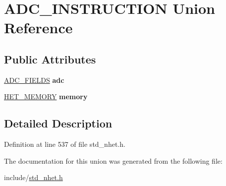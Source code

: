 \hypertarget{unionADC__INSTRUCTION}{}\section{A\+D\+C\+\_\+\+I\+N\+S\+T\+R\+U\+C\+T\+I\+ON Union Reference}
\label{unionADC__INSTRUCTION}
\subsection*{Public Attributes}
\begin{DoxyCompactItemize}
\item 
\mbox{\label{unionADC__INSTRUCTION_aae86e6a07f9b68ebf296733c9899a38d}} 
\mbox{\hyperlink{structADC__format}{A\+D\+C\+\_\+\+F\+I\+E\+L\+DS}} {\bfseries adc}
\item 
\mbox{\label{unionADC__INSTRUCTION_a8535b76695407a89e6a8a1fcf88804de}} 
\mbox{\hyperlink{structmemory__format}{H\+E\+T\+\_\+\+M\+E\+M\+O\+RY}} {\bfseries memory}
\end{DoxyCompactItemize}


\subsection{Detailed Description}


Definition at line 537 of file std\+\_\+nhet.\+h.



The documentation for this union was generated from the following file\+:\begin{DoxyCompactItemize}
\item 
include/\mbox{\hyperlink{std__nhet_8h}{std\+\_\+nhet.\+h}}\end{DoxyCompactItemize}
